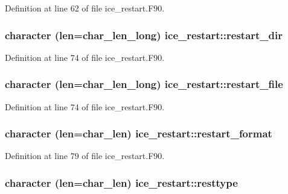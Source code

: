 Definition at line 62 of file ice\_\-restart.F90.\hypertarget{namespaceice__restart_a3a3e9af457ad6b50bfb6574e2d3809c2}{
\subsubsection[{restart\_\-dir}]{\setlength{\rightskip}{0pt plus 5cm}character (len=char\_\-len\_\-long) {\bf ice\_\-restart::restart\_\-dir}}}
\label{namespaceice__restart_a3a3e9af457ad6b50bfb6574e2d3809c2}


Definition at line 74 of file ice\_\-restart.F90.\hypertarget{namespaceice__restart_afe746728ab31bdadb08208876f3b7f12}{
\subsubsection[{restart\_\-file}]{\setlength{\rightskip}{0pt plus 5cm}character (len=char\_\-len\_\-long) {\bf ice\_\-restart::restart\_\-file}}}
\label{namespaceice__restart_afe746728ab31bdadb08208876f3b7f12}


Definition at line 74 of file ice\_\-restart.F90.\hypertarget{namespaceice__restart_a959bc8a517154ec9d4ab801d5bb2c55f}{
\subsubsection[{restart\_\-format}]{\setlength{\rightskip}{0pt plus 5cm}character (len=char\_\-len) {\bf ice\_\-restart::restart\_\-format}}}
\label{namespaceice__restart_a959bc8a517154ec9d4ab801d5bb2c55f}


Definition at line 79 of file ice\_\-restart.F90.\hypertarget{namespaceice__restart_aad4e3d73d50c4539a7b1aa3107da64d2}{
\subsubsection[{resttype}]{\setlength{\rightskip}{0pt plus 5cm}character (len=char\_\-len) {\bf ice\_\-restart::resttype}}}
\label{namespaceice__restart_aad4e3d73d50c4539a7b1aa3107da64d2}


